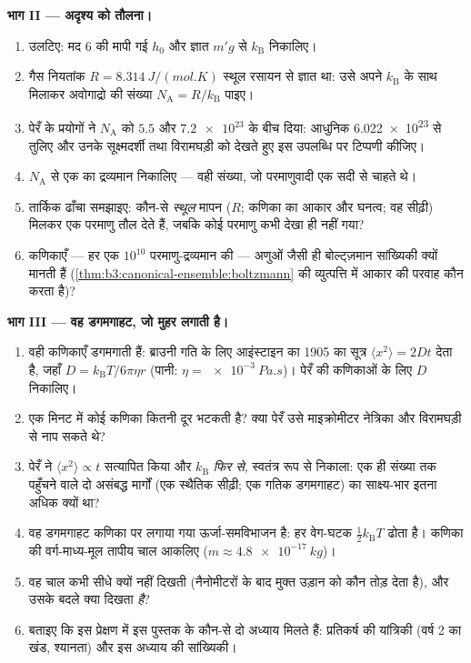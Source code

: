 \begin{problem}
\medskip\noindent\textbf{भाग II --- अदृश्य को तौलना।}
\begin{enumerate}[resume]
  \item उलटिए: मद 6 की मापी गई $h_0$ और ज्ञात
        $m'g$ से $k_{\text{B}}$ निकालिए।
  \item गैस नियतांक $R = \qty{8.314}{J/(mol.K)}$ स्थूल रसायन से
        ज्ञात था: उसे अपने
        $k_{\text{B}}$ के साथ मिलाकर अवोगाद्रो की संख्या $N_{\text{A}} =
        R/k_{\text{B}}$ पाइए।
  \item पेरँ के प्रयोगों ने $N_{\text{A}}$ को $5.5$ और
        $\num{7.2e23}$ के बीच दिया: आधुनिक
        \num{6.022e23} से तुलिए और उनके सूक्ष्मदर्शी तथा
        विरामघड़ी को देखते हुए इस उपलब्धि पर टिप्पणी कीजिए।
  \item $N_{\text{A}}$ से एक  का
        द्रव्यमान निकालिए --- वही संख्या, जो परमाणुवादी एक सदी से
        चाहते थे।
  \item तार्किक ढाँचा समझाइए: कौन-से \emph{स्थूल} मापन
        ($R$; कणिका का आकार और घनत्व; वह सीढ़ी) मिलकर एक परमाणु
        तौल देते हैं, जबकि कोई परमाणु कभी देखा ही नहीं गया?
  \item कणिकाएँ --- हर एक $10^{10}$ परमाणु-द्रव्यमान की ---
        अणुओं जैसी ही बोल्ट्ज़मान सांख्यिकी क्यों मानती हैं
        (\cref{thm:b3:canonical-ensemble:boltzmann} की व्युत्पत्ति
        में आकार की परवाह कौन करता है)?
\end{enumerate}

\medskip\noindent\textbf{भाग III --- वह डगमगाहट, जो मुहर लगाती है।}
\begin{enumerate}[resume]
  \item वही कणिकाएँ डगमगाती हैं: ब्राउनी गति के लिए आइंस्टाइन का
        1905 का सूत्र $\langle x^2\rangle = 2Dt$ देता है, जहाँ $D =
        k_{\text{B}}T/6\pi\eta r$ (पानी: $\eta =
        \qty{e-3}{Pa.s}$)। पेरँ की कणिकाओं के लिए $D$ निकालिए।
  \item एक मिनट में कोई कणिका कितनी दूर भटकती है? क्या पेरँ उसे
        माइक्रोमीटर नेत्रिका और विरामघड़ी से नाप सकते थे?
  \item पेरँ ने $\langle x^2\rangle \propto t$ सत्यापित किया और
        $k_{\text{B}}$ \emph{फिर से}, स्वतंत्र रूप से निकाला:
        एक ही संख्या तक पहुँचने वाले दो असंबद्ध मार्गों (एक
        स्थैतिक सीढ़ी; एक गतिक डगमगाहट) का साक्ष्य-भार इतना अधिक
        क्यों था?
  \item वह डगमगाहट कणिका पर लगाया गया ऊर्जा-समविभाजन है: हर
        वेग-घटक $\tfrac12 k_{\text{B}}T$ ढोता है।
        कणिका की वर्ग-माध्य-मूल तापीय चाल आकलिए ($m \approx
        \qty{4.8e-17}{kg}$)।
  \item वह चाल कभी सीधे क्यों नहीं दिखती (नैनोमीटरों के बाद मुक्त
        उड़ान को कौन तोड़ देता है), और उसके बदले क्या दिखता
        \emph{है}?
  \item बताइए कि इस प्रेक्षण में इस पुस्तक के कौन-से दो अध्याय
        मिलते हैं: प्रतिकर्ष की यांत्रिकी (वर्ष 2 का खंड,
        श्यानता) और इस अध्याय की सांख्यिकी।
\end{enumerate}


\end{problem}
